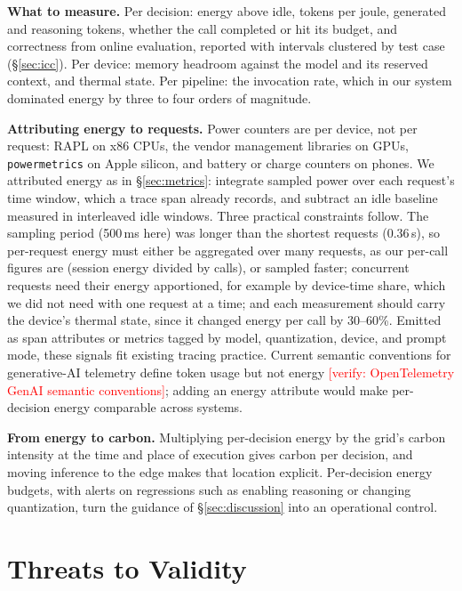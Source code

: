\documentclass[conference]{IEEEtran}
\newcommand{\verify}[1]{\textcolor{red}{[verify: #1]}}
\begin{document}
\textbf{What to measure.} Per decision: energy above idle, tokens per joule, generated and reasoning tokens, whether the call completed or hit its budget, and correctness from online evaluation, reported with intervals clustered by test case (\S\ref{sec:icc}). Per device: memory headroom against the model and its reserved context, and thermal state. Per pipeline: the invocation rate, which in our system dominated energy by three to four orders of magnitude.

\textbf{Attributing energy to requests.} Power counters are per device, not per request: RAPL on x86 CPUs, the vendor management libraries on GPUs, \texttt{powermetrics} on Apple silicon, and battery or charge counters on phones. We attributed energy as in \S\ref{sec:metrics}: integrate sampled power over each request's time window, which a trace span already records, and subtract an idle baseline measured in interleaved idle windows. Three practical constraints follow. The sampling period (500\,ms here) was longer than the shortest requests (0.36\,s), so per-request energy must either be aggregated over many requests, as our per-call figures are (session energy divided by calls), or sampled faster; concurrent requests need their energy apportioned, for example by device-time share, which we did not need with one request at a time; and each measurement should carry the device's thermal state, since it changed energy per call by 30--60\%. Emitted as span attributes or metrics tagged by model, quantization, device, and prompt mode, these signals fit existing tracing practice. Current semantic conventions for generative-AI telemetry define token usage but not energy \verify{OpenTelemetry GenAI semantic conventions}; adding an energy attribute would make per-decision energy comparable across systems.

\textbf{From energy to carbon.} Multiplying per-decision energy by the grid's carbon intensity at the time and place of execution gives carbon per decision, and moving inference to the edge makes that location explicit. Per-decision energy budgets, with alerts on regressions such as enabling reasoning or changing quantization, turn the guidance of \S\ref{sec:discussion} into an operational control.

\section{Threats to Validity}
\label{sec:threats}
\end{document}
